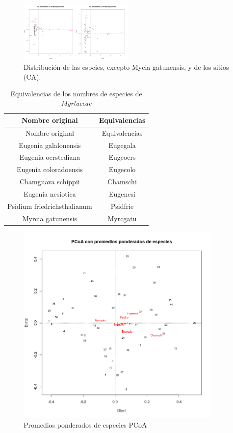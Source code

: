 \documentclass[11pt,]{article}
\begin{document}
\begin{figure}
\centering
\includegraphics[width=0.50000\textwidth]{escalamiento sin myrcga.png}
\caption{Distribución de las espcies, excepto Mycia gatunensis, y de los
sitios (CA).\label{fig:escal_sin_myrcia}}
\end{figure}

\begin{longtable}[]{@{}cc@{}}
\caption{\label{tab:equivalencias} Equivalencias de los nombres de
especies de \emph{Myrtaceae}}\tabularnewline
\toprule
Nombre original & Equivalencias\tabularnewline
\midrule
\endfirsthead
\toprule
Nombre original & Equivalencias\tabularnewline
\midrule
\endhead
Eugenia galalonensis & Eugegala\tabularnewline
Eugenia oerstediana & Eugeoers\tabularnewline
Eugenia coloradoensis & Eugecolo\tabularnewline
Chamguava schippii & Chamschi\tabularnewline
Eugenia nesiotica & Eugenesi\tabularnewline
Psidium friedrichsthalianum & Psidfrie\tabularnewline
Myrcia gatunensis & Myrcgatu\tabularnewline
\bottomrule
\end{longtable}

\begin{figure}
\centering
\includegraphics[width=0.90000\textwidth]{PCoA escalamiento_dat_mix.png}
\caption{Promedios ponderados de especies PCoA\label{fig:pcoa esc}}
\end{figure}
\end{document}
